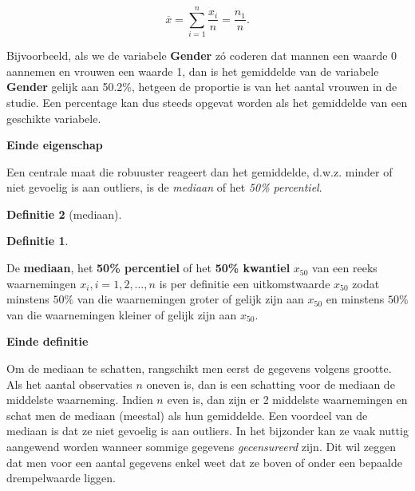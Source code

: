 \documentclass[
  12pt,dutch,coursenotes]{book}
\newenvironment{Shaded}{\begin{snugshade}}{\end{snugshade}}
\newcommand{\DataTypeTok}[1]{\textcolor[rgb]{0.13,0.29,0.53}{#1}}
\newcommand{\KeywordTok}[1]{\textcolor[rgb]{0.13,0.29,0.53}{\textbf{#1}}}
\newcommand{\NormalTok}[1]{#1}
\newcommand{\OperatorTok}[1]{\textcolor[rgb]{0.81,0.36,0.00}{\textbf{#1}}}
\newcommand{\OtherTok}[1]{\textcolor[rgb]{0.56,0.35,0.01}{#1}}
\theoremstyle{definition}
\newtheorem{definition}{Definitie}[chapter]
\theoremstyle{definition}
\theoremstyle{definition}
\theoremstyle{remark}
\begin{document}
\begin{equation*}
\overline{x}= \sum_{i=1}^n \frac{x_i}{n} = \frac{n_1}{n}.
\end{equation*}

Bijvoorbeeld, als we de variabele \textbf{Gender} zó
coderen dat mannen een waarde 0 aannemen en vrouwen een waarde 1, dan is het
gemiddelde van de variabele \textbf{Gender} gelijk aan 50.2\%, hetgeen de proportie is van het aantal vrouwen in de studie. Een percentage kan dus
steeds opgevat worden als het gemiddelde van een geschikte variabele.

\textbf{Einde eigenschap}

Een centrale maat die robuuster reageert dan het gemiddelde, d.w.z. minder
of niet gevoelig is aan outliers, is de \emph{mediaan} of het \emph{50\% percentiel}.

\begin{definition}[mediaan]
\begin{definition}

\protect\hypertarget{def:unnamed-chunk-95}{}{\label{def:unnamed-chunk-95} \iffalse (mediaan) \fi{} }

\end{definition}
\end{definition}

De \textbf{mediaan}, het \textbf{50\% percentiel} of het \textbf{50\%
kwantiel} \(x_{50}\) van een reeks waarnemingen \(x_i, i=1, 2, \dots, n\) is per
definitie een uitkomstwaarde \(x_{50}\) zodat minstens \(50\%\) van die
waarnemingen groter of gelijk zijn aan \(x_{50}\) en minstens \(50\%\) van die
waarnemingen kleiner of gelijk zijn aan \(x_{50}\).

\textbf{Einde definitie}

Om de mediaan te schatten, rangschikt men eerst de gegevens volgens grootte.
Als het aantal observaties \(n\) oneven is, dan is een schatting voor de
mediaan de middelste waarneming. Indien \(n\) even is, dan zijn er 2 middelste
waarnemingen en schat men de mediaan (meestal) als hun gemiddelde. Een
voordeel van de mediaan is dat ze niet gevoelig is aan outliers. In het bijzonder kan
ze vaak nuttig aangewend worden wanneer sommige gegevens \emph{gecensureerd}
zijn. Dit wil zeggen dat men voor een aantal gegevens enkel weet dat ze
boven of onder een bepaalde drempelwaarde liggen.

\begin{Shaded}
\end{Shaded}
\end{document}
